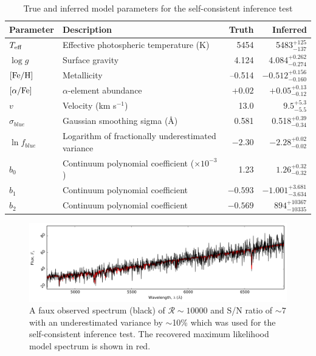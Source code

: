 \documentclass[iop]{emulateapj}
\begin{document}
\begin{table}
\center
\caption{True and inferred model parameters for the self-consistent inference test}
\label{tab:inference-test}
\begin{tabular}{llrr}
\hline
\hline
Parameter & Description & Truth & Inferred \\
\hline
$T_{\rm eff}$ & Effective photospheric temperature (K) & 5454 & 5483$_{-137}^{+125}$ \\
$\log{}g$ & Surface gravity & 4.124 & 4.084$_{-0.274}^{+0.262}$ \\
${\rm [Fe/H]}$  & Metallicity & --0.514 & $-0.512_{-0.160}^{+0.156}$ \\
$[\alpha/{\rm Fe}]$ & $\alpha$-element abundance & $+0.02$ & $+0.05_{-0.12}^{+0.13}$ \\
$v$     & Velocity (km s$^{-1}$) & 13.0 & $9.5_{-5.5}^{+5.3}$ \\
$\sigma_{blue}$ & Gaussian smoothing sigma (\AA{}) & 0.581 & 0.518$_{-0.34}^{+0.39}$ \\
$\ln{f_{blue}}$ & Logarithm of fractionally underestimated variance & $-2.30$ & $-2.28_{-0.02}^{+0.02}$ \\
$b_{0}$ & Continuum polynomial coefficient ($\times10^{-3}$) & 1.23 & $1.26_{-0.32}^{+0.32}$ \\
$b_{1}$ & Continuum polynomial coefficient & $-0.593$ & $-1.001_{-3.634}^{+3.681}$ \\
$b_{2}$ & Continuum polynomial coefficient & $-0.569$ & $894_{-10335}^{+10367}$ \\
\hline
\end{tabular}
\end{table}

\begin{figure}
\label{fig:spectrum-inference}
\includegraphics[width=\textwidth]{spectrum.pdf}
\caption{A faux observed spectrum (black) of $\mathcal{R} \sim 10000$ and S/N 
ratio of $\sim7$ with an underestimated variance by $\sim$10\% which was used for 
the self-consistent inference test. The recovered maximum likelihood model spectrum 
is shown in red. }
\end{figure}
\end{document}
